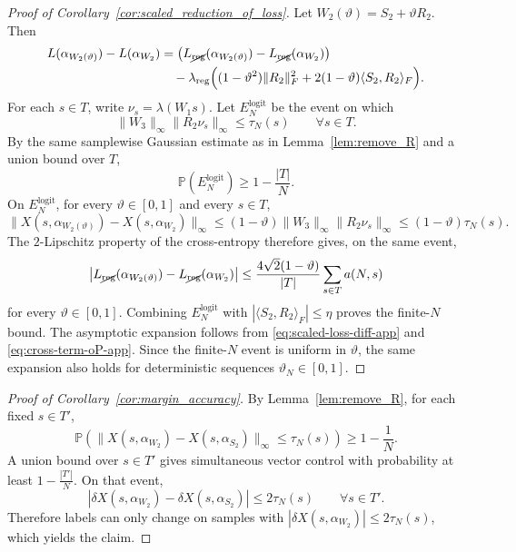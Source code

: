 \documentclass[11pt]{article}
\theoremstyle{plain}
\theoremstyle{definition}
\theoremstyle{remark}
\newcommand{\PP}{\mathbb{P}}
\newcommand{\1}{\mathbf{1}}
\begin{document}
\begin{proof}[Proof of Corollary~\ref{cor:scaled_reduction_of_loss}]
Let \(W_2(\vartheta)=S_2+\vartheta R_2\). Then
\begin{align}
L(\alpha_{W_2(\vartheta)})-L(\alpha_{W_2})
&=
\big(L_{\cancel{\mathrm{reg}}}(\alpha_{W_2(\vartheta)})-L_{\cancel{\mathrm{reg}}}(\alpha_{W_2})\big)\notag\\
&\quad-
\lambda_{\mathrm{reg}}
\Big(
(1-\vartheta^2)\|R_2\|_F^2
+
2(1-\vartheta)\langle S_2,R_2\rangle_F
\Big).
\label{eq:scaled-loss-diff-app}
\end{align}
For each \(s\in T\), write \(\nu_s=\lambda(W_1s)\). Let \(E_N^{\mathrm{logit}}\) be the event on which
\[
\|W_3\|_\infty\|R_2\nu_s\|_\infty\le \tau_N(s)
\qquad\forall s\in T.
\]
By the same samplewise Gaussian estimate as in Lemma~\ref{lem:remove_R} and a union bound over \(T\),
\[
\PP(E_N^{\mathrm{logit}})\ge 1-\frac{|T|}{N}.
\]
On \(E_N^{\mathrm{logit}}\), for every \(\vartheta\in[0,1]\) and every \(s\in T\),
\[
\big\|X(s,\alpha_{W_2(\vartheta)})-X(s,\alpha_{W_2})\big\|_\infty
\le
(1-\vartheta)\|W_3\|_\infty \|R_2\nu_s\|_\infty
\le
(1-\vartheta)\tau_N(s).
\]
The \(2\)-Lipschitz property of the cross-entropy therefore gives, on the same event,
\[
\big|L_{\cancel{\mathrm{reg}}}(\alpha_{W_2(\vartheta)})-L_{\cancel{\mathrm{reg}}}(\alpha_{W_2})\big|
\le
\frac{4\sqrt{2}(1-\vartheta)}{|T|}\sum_{s\in T}a(N,s)
\]
for every \(\vartheta\in[0,1]\). Combining \(E_N^{\mathrm{logit}}\) with \(|\langle S_2,R_2\rangle_F|\le \eta\) proves the finite-\(N\) bound. The asymptotic expansion follows from \eqref{eq:scaled-loss-diff-app} and \eqref{eq:cross-term-oP-app}. Since the finite-\(N\) event is uniform in \(\vartheta\), the same expansion also holds for deterministic sequences \(\vartheta_N\in[0,1]\).
\end{proof}

\begin{proof}[Proof of Corollary~\ref{cor:margin_accuracy}]
By Lemma~\ref{lem:remove_R}, for each fixed \(s\in T'\),
\[
\PP\!\left(
\|X(s,\alpha_{W_2})-X(s,\alpha_{S_2})\|_\infty\le \tau_N(s)
\right)\ge 1-\frac{1}{N}.
\]
A union bound over \(s\in T'\) gives simultaneous vector control with probability at least \(1-\frac{|T'|}{N}\). On that event,
\[
|\delta X(s,\alpha_{W_2})-\delta X(s,\alpha_{S_2})|\le 2\tau_N(s)
\qquad\forall s\in T'.
\]
Therefore labels can only change on samples with \(|\delta X(s,\alpha_{W_2})|\le 2\tau_N(s)\), which yields the claim.
\end{proof}
\end{document}
